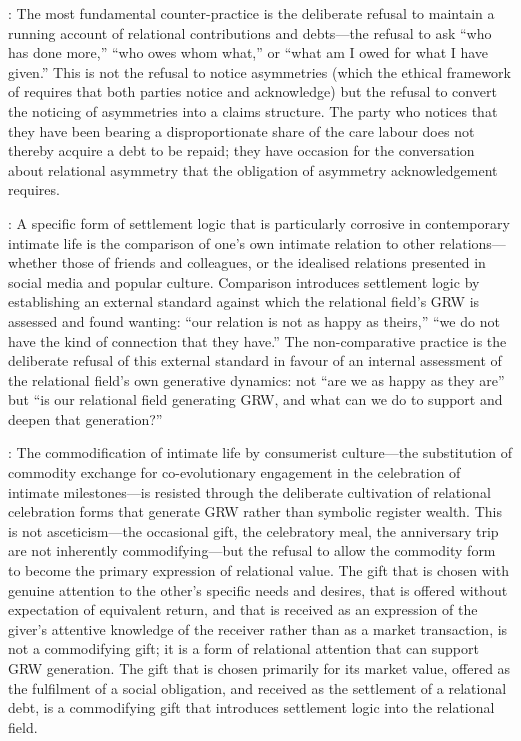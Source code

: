 : The most fundamental counter-practice is the deliberate refusal to maintain a running account of relational contributions and debts---the refusal to ask ``who has done more,'' ``who owes whom what,'' or ``what am I owed for what I have given.'' This is not the refusal to notice asymmetries (which the ethical framework of  requires that both parties notice and acknowledge) but the refusal to convert the noticing of asymmetries into a claims structure. The party who notices that they have been bearing a disproportionate share of the care labour does not thereby acquire a debt to be repaid; they have occasion for the conversation about relational asymmetry that the obligation of asymmetry acknowledgement requires.

: A specific form of settlement logic that is particularly corrosive in contemporary intimate life is the comparison of one's own intimate relation to other relations---whether those of friends and colleagues, or the idealised relations presented in social media and popular culture. Comparison introduces settlement logic by establishing an external standard against which the relational field's GRW is assessed and found wanting: ``our relation is not as happy as theirs,'' ``we do not have the kind of connection that they have.'' The non-comparative practice is the deliberate refusal of this external standard in favour of an internal assessment of the relational field's own generative dynamics: not ``are we as happy as they are'' but ``is our relational field generating GRW, and what can we do to support and deepen that generation?''

: The commodification of intimate life by consumerist culture---the substitution of commodity exchange for co-evolutionary engagement in the celebration of intimate milestones---is resisted through the deliberate cultivation of relational celebration forms that generate GRW rather than symbolic register wealth. This is not asceticism---the occasional gift, the celebratory meal, the anniversary trip are not inherently commodifying---but the refusal to allow the commodity form to become the primary expression of relational value. The gift that is chosen with genuine attention to the other's specific needs and desires, that is offered without expectation of equivalent return, and that is received as an expression of the giver's attentive knowledge of the receiver rather than as a market transaction, is not a commodifying gift; it is a form of relational attention that can support GRW generation. The gift that is chosen primarily for its market value, offered as the fulfilment of a social obligation, and received as the settlement of a relational debt, is a commodifying gift that introduces settlement logic into the relational field.

